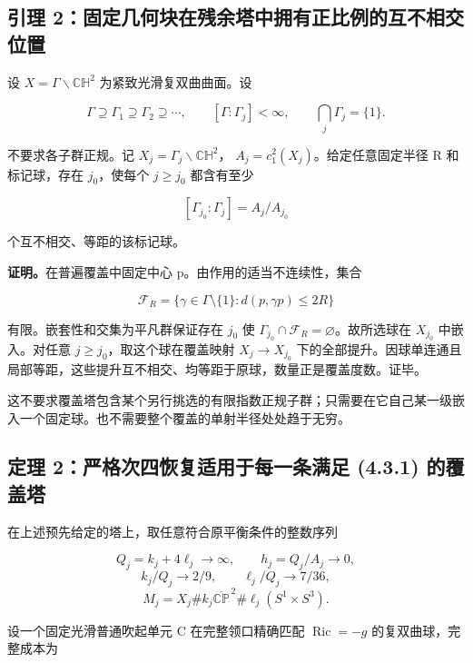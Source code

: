 \documentclass[UTF8,11pt,fontset=none]{ctexart}
\theoremstyle{definition}
\theoremstyle{remark}
\begin{document}
\subsection{引理 2：固定几何块在残余塔中拥有正比例的互不相交位置}\label{v4-ux5f15ux7406-2ux56faux5b9aux51e0ux4f55ux5757ux5728ux6b8bux4f59ux5854ux4e2dux62e5ux6709ux6b63ux6bd4ux4f8bux7684ux4e92ux4e0dux76f8ux4ea4ux4f4dux7f6e}

设 \(X=\Gamma\backslash\mathbb{CH}^2\) 为紧致光滑复双曲曲面。设

\[
\Gamma\supseteq\Gamma_1\supseteq\Gamma_2\supseteq\cdots,
\qquad [\Gamma:\Gamma_j]<\infty,
\qquad \bigcap_j\Gamma_j=\{1\}.
\tag{4.3.1}
\]

不要求各子群正规。记 \(X_j=\Gamma_j\backslash\mathbb{CH}^2\)， \(A_j=c_1^2(X_j)\)。给定任意固定半径 R 和标记球，存在 \(j_0\)，使每个 \(j\ge j_0\) 都含有至少

\[
[\Gamma_{j_0}:\Gamma_j]=A_j/A_{j_0}
\]

个互不相交、等距的该标记球。

\textbf{证明。}在普遍覆盖中固定中心 p。由作用的适当不连续性，集合

\[
\mathcal F_R=\{\gamma\in\Gamma\setminus\{1\}:d(p,\gamma p)\le2R\}
\]

有限。嵌套性和交集为平凡群保证存在 \(j_0\) 使 \(\Gamma_{j_0}\cap\mathcal F_R=\varnothing\)。故所选球在 \(X_{j_0}\) 中嵌入。对任意 \(j\ge j_0\)，取这个球在覆盖映射 \(X_j\to X_{j_0}\) 下的全部提升。因球单连通且局部等距，这些提升互不相交、均等距于原球，数量正是覆盖度数。证毕。

这不要求覆盖塔包含某个另行挑选的有限指数正规子群；只需要在它自己某一级嵌入一个固定球。也不需要整个覆盖的单射半径处处趋于无穷。

\subsection{定理 2：严格次四恢复适用于每一条满足 (4.3.1) 的覆盖塔}\label{v4-ux5b9aux7406-2ux4e25ux683cux6b21ux56dbux6062ux590dux9002ux7528ux4e8eux6bcfux4e00ux6761ux6ee1ux8db3-4.3.1-ux7684ux8986ux76d6ux5854}

在上述预先给定的塔上，取任意符合原平衡条件的整数序列

\[
Q_j=k_j+4\ell_j\to\infty,\qquad h_j=Q_j/A_j\to0,
\] \[
k_j/Q_j\to2/9,\qquad \ell_j/Q_j\to7/36,
\] \[
M_j=X_j\#k_j\overline{\mathbb{CP}}^{\,2}
\#\ell_j(S^1\times S^3).
\]

设一个固定光滑普通吹起单元 C 在完整领口精确匹配 \(\operatorname{Ric}=-g\) 的复双曲球，完整成本为
\end{document}
